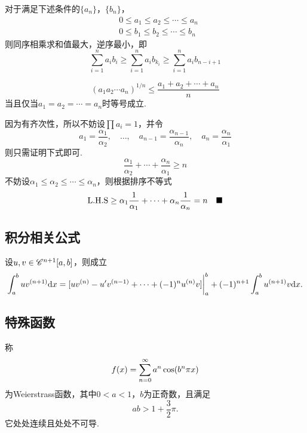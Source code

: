  \begin{lemma}[排序不等式]
    \label{lemma: 排序不等式}
    对于满足下述条件的$\{a_n\}$，$\{b_n\}$，
    \[\begin{split}
      & 0 \le a_1\le a_2\le\cdots\le a_n \\
      & 0 \le b_1\le b_2\le\cdots\le b_n
    \end{split}\]
    则同序相乘求和值最大，逆序最小，即
    \[
      \sum_{i=1}^n a_ib_i \ge \sum_{i=1}^n a_ib_{k_i}
      \ge \sum_{i=1}^n a_ib_{n-i+1}
    \]
  \end{lemma}

  \begin{lemma}[算数-几何均值不等式]
    \[
      (a_1a_2\cdots a_n)^{1/n} \le \frac{a_1+a_2+\cdots+a_n}{n}
    \]
    当且仅当$a_1 = a_2 = \cdots = a_n$时等号成立.
  \end{lemma}
  \proof
    因为有齐次性，所以不妨设$\prod a_i=1$，并令
    \[
      a_1=\frac{\alpha_1}{\alpha_2},\quad
      \dots,\quad
      a_{n-1} = \frac{\alpha_{n-1}}{\alpha_n},\quad
      a_n = \frac{\alpha_n}{\alpha_1}
    \]
    则只需证明下式即可.
    \[
      \frac{\alpha_1}{\alpha_2} + \cdots + \frac{\alpha_n}{\alpha_1}
      \ge n
    \]
    不妨设$\alpha_1 \le \alpha_2 \le \cdots \le \alpha_n$，则根据排序不等式
    \[
      \text{L.H.S} \ge \alpha_1\frac{1}{\alpha_1} + \cdots + \alpha_n\frac{1}{\alpha_n}
       = n \quad\blacksquare
    \]

\newpage
\subsection{积分相关公式}
  \begin{lemma}[分部积分]
    设$u,v\in\mathscr{C}^{n+1}[a, b]$，则成立
    \[
      \int_a^buv^{(n+1)}\mathrm{d} x =
      [ uv^{(n)} - u^\prime v^{(n-1)} + \cdots +  (-1)^nu^{(n)}v]
      \bigg\vert_a^b + (-1)^{n+1}\int_a^bu^{(n+1)}v\mathrm{d} x.
    \]
  \end{lemma}

\newpage
\subsection{特殊函数}
  \begin{defi}[处处连续且不可导]
    称
    \[
      \mathnormal{f}(x) = \sum_{n=0}^\infty a^n\cos(b^n\pi x)
    \]
    为Weierstrass函数，其中$0<a<1$，$b$为正奇数，且满足
    \[
      ab > 1 + \frac{3}{2}\pi.
    \]
    它处处连续且处处不可导.
  \end{defi}

\newpage



